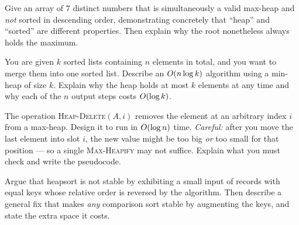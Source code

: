 \begin{exercise}
Give an array of $7$ distinct numbers that is simultaneously a valid max-heap and
\emph{not} sorted in descending order, demonstrating concretely that ``heap'' and
``sorted'' are different properties. Then explain why the root nonetheless always
holds the maximum.
\end{exercise}

\begin{exercise}[Challenge]
You are given $k$ sorted lists containing $n$ elements in total, and you want to
merge them into one sorted list. Describe an $O(n \log k)$ algorithm using a
min-heap of size $k$. Explain why the heap holds at most $k$ elements at any time
and why each of the $n$ output steps costs $O(\log k)$.
\end{exercise}

\begin{exercise}[Challenge]
The operation \textsc{Heap-Delete}$(A, i)$ removes the element at an arbitrary
index $i$ from a max-heap. Design it to run in $O(\log n)$ time. \emph{Careful:}
after you move the last element into slot $i$, the new value might be too big
\emph{or} too small for that position --- so a single \textsc{Max-Heapify} may not
suffice. Explain what you must check and write the pseudocode.
\end{exercise}

\begin{exercise}[Challenge]
Argue that heapsort is not stable by exhibiting a small input of records with
equal keys whose relative order is reversed by the algorithm. Then describe a
general fix that makes \emph{any} comparison sort stable by augmenting the keys,
and state the extra space it costs.
\end{exercise}
